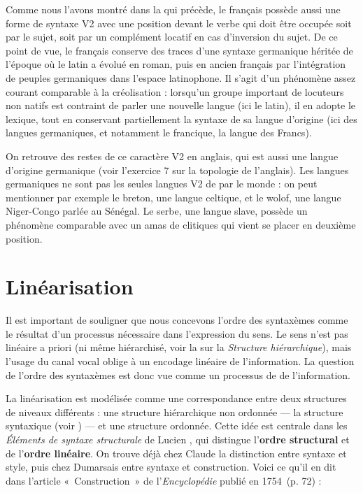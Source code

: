 {    Comme nous l’avons montré dans la  qui précède, le français possède aussi une forme de syntaxe V2 avec une position devant le verbe qui doit être occupée soit par le sujet, soit par un complément locatif en cas d’inversion du sujet. De ce point de vue, le français conserve des traces d’une syntaxe germanique héritée de l’époque où le latin a évolué en roman, puis en ancien français par l’intégration de peuples germaniques dans l’espace latinophone. Il s’agit d’un phénomène assez courant comparable à la créolisation : lorsqu’un groupe important de locuteurs non natifs est contraint de parler une nouvelle langue (ici le latin), il en adopte le lexique, tout en conservant partiellement la syntaxe de sa langue d’origine (ici des langues germaniques, et notamment le francique, la langue des Francs).

    On retrouve des restes de ce caractère V2 en anglais, qui est aussi une langue d’origine germanique (voir l’exercice 7 sur la topologie de l’anglais). Les langues germaniques ne sont pas les seules langues V2 de par le monde : on peut mentionner par exemple le breton, une langue celtique, et le wolof, une langue Niger-Congo parlée au Sénégal. Le serbe, une langue slave, possède un phénomène comparable avec un amas de clitiques qui vient se placer en deuxième position.
}
\section{Linéarisation}\label{sec:3.5.6}

Il est important de souligner que nous concevons l’ordre des syntaxèmes comme le résultat d’un processus nécessaire dans l’expression du sens. Le sens n’est pas linéaire a priori (ni même hiérarchisé, voir la  sur la \textit{Structure hiérarchique}), mais l’usage du canal vocal oblige à un encodage linéaire de l’information. La question de l’ordre des syntaxèmes est donc vue comme un processus de  de l’information.

La linéarisation est modélisée comme une correspondance entre deux structures de niveaux différents : une structure hiérarchique non ordonnée — la structure syntaxique (voir ) — et une structure ordonnée. Cette idée est centrale dans les \textit{Éléments de syntaxe structurale} de Lucien \citet{tesniere1959elements}, qui distingue l’\textbf{ordre structural} et de l’\textbf{ordre linéaire}. On trouve déjà chez Claude \citet{buffier1709grammaire} la distinction entre syntaxe et style, puis chez Dumarsais entre syntaxe et construction. Voici ce qu’il en dit dans l’article «~Construction~» de l’\textit{Encyclopédie} publié en 1754~(p. 72) :

